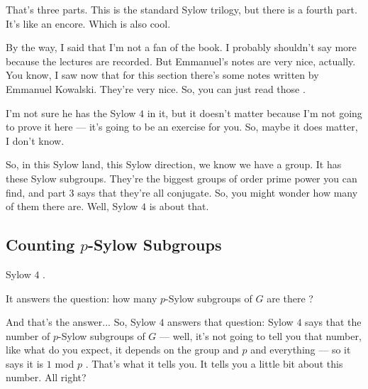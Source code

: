 \begin{speech}[00:39:23 - 00:40:46]
That's three parts. This is the standard Sylow trilogy, but there is a fourth part. It's like an encore. Which is also cool.

By the way, I said that I'm not a fan of the book. I probably shouldn't say more because the lectures are recorded. But Emmanuel's notes are very nice, actually. You know, I saw now that for this section there's some notes written by Emmanuel Kowalski. They're very nice. So, you can just read those .

I'm not sure he has the Sylow $4$ in it, but it doesn't matter because I'm not going to prove it here --- it's going to be an exercise for you. So, maybe it does matter, I don't know.

So, in this Sylow land, this Sylow direction, we know we have a group. It has these Sylow subgroups. They're the biggest groups of order prime power you can find, and part $3$ says that they're all conjugate. So, you might wonder how many of them there are. Well, Sylow $4$ is about that.
\end{speech}

\subsection{Counting \texorpdfstring{$p$}{p}-Sylow Subgroups}

\begin{speech}[00:40:46 - 00:41:47]
Sylow $4$ .

It answers the question: how many $p$-Sylow subgroups of $G$ are there ?

And that's the answer... So, Sylow $4$ answers that question: Sylow $4$ says that the number of $p$-Sylow subgroups of $G$  --- well, it's not going to tell you that number, like what do you expect, it depends on the group and $p$ and everything --- so it says it is $1$ mod $p$ . That's what it tells you. It tells you a little bit about this number. All right?
\end{speech}

\begin{content}
\end{content}

